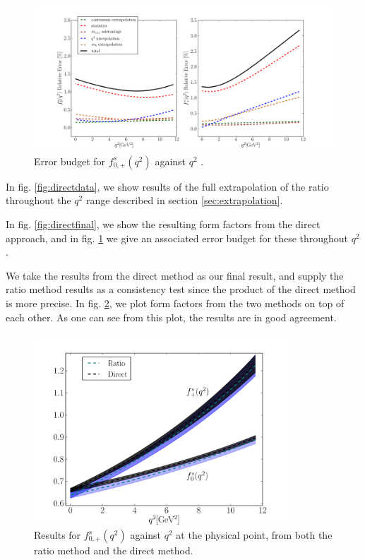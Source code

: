 \begin{figure}[htb!]
  \hspace{-85pt}
  \includegraphics[width=1.4\textwidth]{images/BsDs/direct/errorbudget.pdf}
  \caption{ Error budget for $f_{0,+}^s(q^2)$ against $q^2$ \label{fig:directerrorbudget}.}
\end{figure}

In fig. \ref{fig:directdata}, we show results of the full extrapolation of the ratio throughout the $q^2$ range described in section \ref{sec:extrapolation}.

In fig. \ref{fig:directfinal}, we show the resulting form factors from the direct approach, and in fig. \ref{fig:directerrorbudget} we give an associated error budget for these throughout $q^2$.

We take the results from the direct method as our final result, and supply the ratio method results as a consistency test since the product of the direct method is more precise. In fig. \ref{fig:ratiovsdirect}, we plot form factors from the two methods on top of each other. As one can see from this plot, the results are in good agreement.

\begin{figure}[htb!]
  \begin{center}
  \includegraphics[width=0.85\textwidth]{images/BsDs/ratio_vs_direct.pdf}
  \caption{ Results for $f_{0,+}^s(q^2)$ against $q^2$ at the physical point, from both the ratio method and the direct method. \label{fig:ratiovsdirect}}
    \end{center}
\end{figure}

